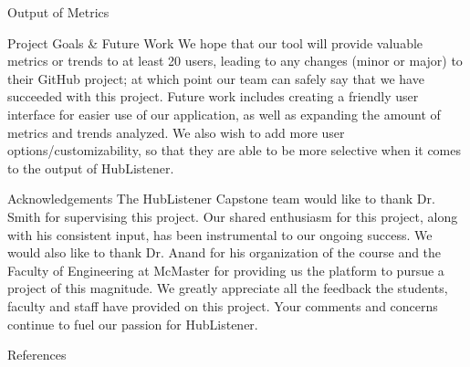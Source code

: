 \documentclass[22pt]{beamer}
\begin{document}
\begin{frame}[fragile]
\begin{textblock}{7.25}
\begin{block}{Output of Metrics}
\end{block}

\begin{block}{Project Goals \& Future Work}
We hope that our tool will provide valuable metrics or trends to at least 20 users, leading to any changes (minor or major) to their GitHub project; at which point our team can safely say that we have succeeded with this project. Future work includes creating a friendly user interface for easier use of our application, as well as expanding the amount of metrics and trends analyzed. We also wish to add more user options/customizability, so that they are able to be more selective when it comes to the output of HubListener.
\end{block}

\begin{block}{Acknowledgements}
The HubListener Capstone team would like to thank Dr. Smith for supervising this project. Our shared enthusiasm for this project, along with his consistent input, has been instrumental to our ongoing success. We would also like to thank Dr. Anand for his organization of the course and the Faculty of Engineering at McMaster for providing us the platform to pursue a project of this magnitude. We greatly appreciate all the feedback the students, faculty and staff have provided on this project. Your comments and concerns continue to fuel our passion for HubListener. 
\end{block}


\begin{block}{References}

{\scriptsize
}
\end{block}

\begin{figure}[htbp]
\end{figure}
\end{textblock}


\end{frame}
\end{document}
